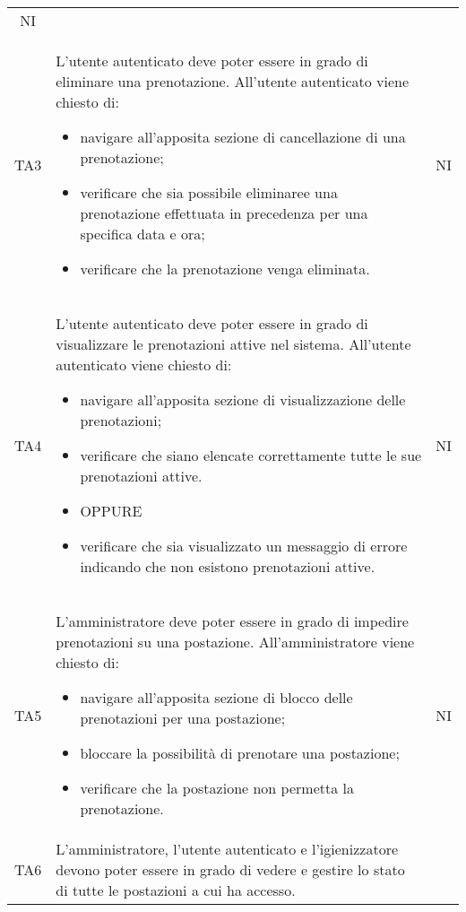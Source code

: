 {\begin{longtable}{ c C{11cm} c }
        NI\\
        TA3&
        L'utente autenticato deve poter essere in grado di eliminare una prenotazione.\newline
        All'utente autenticato viene chiesto di:
        \begin{itemize}
            \item navigare all'apposita sezione di cancellazione di una prenotazione;
            \item verificare che sia possibile eliminaree una prenotazione effettuata in precedenza per una specifica data e ora;
            \item verificare che la prenotazione venga eliminata.
        \end{itemize}&
        NI\\
        TA4&
        L'utente autenticato deve poter essere in grado di visualizzare le prenotazioni attive nel sistema.\newline
        All'utente autenticato viene chiesto di:
        \begin{itemize}
            \item navigare all'apposita sezione di visualizzazione delle prenotazioni;
            \item verificare che siano elencate correttamente tutte le sue prenotazioni attive.
            \item [] OPPURE
            \item verificare che sia visualizzato un messaggio di errore indicando che non esistono prenotazioni attive.
        \end{itemize}&
        NI\\
        TA5&
        L'amministratore deve poter essere in grado di impedire prenotazioni su una postazione.\newline
        All'amministratore viene chiesto di:
        \begin{itemize}
            \item navigare all'apposita sezione di blocco delle prenotazioni per una postazione;
            \item bloccare la possibilità di prenotare una postazione;
            \item verificare che la postazione non permetta la prenotazione.
        \end{itemize}&
        NI\\
        TA6&
        L'amministratore, l'utente autenticato e l'igienizzatore devono poter essere in grado di vedere e gestire lo stato di tutte le postazioni a cui ha accesso.\newline

\end{longtable}}
